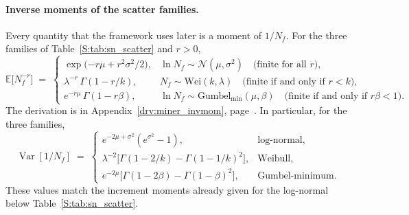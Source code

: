 \documentclass[11pt,a4paper]{article}
\theoremstyle{plain}
\theoremstyle{definition}
\theoremstyle{remark}
\begin{document}
\paragraph{Inverse moments of the scatter families.}
Every quantity that the framework uses later is a moment of $1/N_f$.
For the three families of Table~\ref{S:tab:sn_scatter} and $r > 0$,
\begin{equation}\label{eq:miner_invmom}
  \mathbb{E}\big[N_f^{-r}\big] \;=\;
  \begin{cases}
    \exp\big({-r\mu + r^2\sigma^2/2}\big), & \ln N_f \sim \mathcal{N}(\mu,\sigma^2) \quad \text{(finite for all $r$)},\\[3pt]
    \lambda^{-r}\,\Gamma(1 - r/k), & N_f \sim \mathrm{Wei}(k,\lambda) \quad \text{(finite if and only if $r < k$)},\\[3pt]
    e^{-r\mu}\,\Gamma(1 - r\beta), & \ln N_f \sim \mathrm{Gumbel}_{\min}(\mu,\beta) \quad \text{(finite if and only if $r\beta < 1$)}.
  \end{cases}
\end{equation}
The derivation is in Appendix~\ref{drv:miner_invmom}, page~\pageref{drv:miner_invmom}.
In particular, for the three families,
\begin{equation}
  \operatorname{Var}[1/N_f] \;=\;
  \begin{cases}
    e^{-2\mu+\sigma^2}(e^{\sigma^2}-1), & \text{log-normal},\\[3pt]
    \lambda^{-2}\big[\Gamma(1-2/k)-\Gamma(1-1/k)^2\big], & \text{Weibull},\\[3pt]
    e^{-2\mu}\big[\Gamma(1-2\beta)-\Gamma(1-\beta)^2\big], & \text{Gumbel-minimum}.
  \end{cases}
\end{equation}
These values match the increment moments already given for the log-normal below Table~\ref{S:tab:sn_scatter}.
\end{document}
